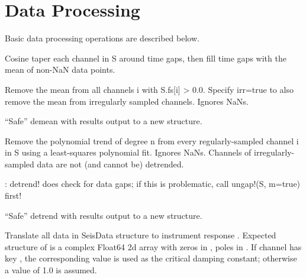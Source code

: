 \documentclass[letterpaper,11pt,english]{sphinxmanual}
\begin{document}
\section{Data Processing}
\label{\detokenize{src/Processing/processing:data-processing}}\label{\detokenize{src/Processing/processing::doc}}
Basic data processing operations are described below.


\begin{fulllineitems}
\end{fulllineitems}


Cosine taper each channel in S around time gaps, then fill time gaps with the mean of non-NaN data points.

Remove the mean from all channels i with S.fs{[}i{]} \textgreater{} 0.0. Specify irr=true to also remove the mean from irregularly sampled channels. Ignores NaNs.

“Safe” demean with results output to a new structure.

Remove the polynomial trend of degree n from every regularly-sampled channel i in S using a least-squares polynomial fit. Ignores NaNs. Channels of irregularly-sampled data are not (and cannot be) detrended.

: detrend! does  check for data gaps; if this is problematic, call ungap!(S, m=true) first!

“Safe” detrend with results output to a new structure.


\begin{fulllineitems}
\end{fulllineitems}


Translate all data in SeisData structure  to instrument response . Expected structure of  is a complex Float64 2d array with zeros in , poles in . If channel  has key , the corresponding value is used as the critical damping constant; otherwise a value of 1.0 is assumed.

\begin{fulllineitems}
\label{\detokenize{src/Processing/processing:lcfs}}
\end{fulllineitems}
\end{document}
